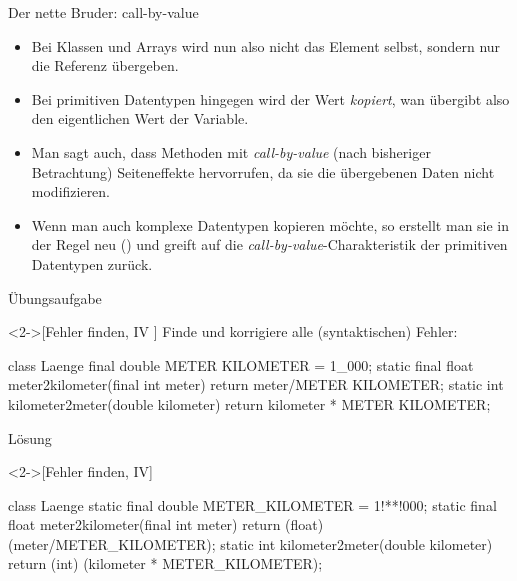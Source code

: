 \begin{frame}[fragile]{Der nette Bruder: call-by-value}
    \begin{itemize}[<+(1)->]
        \widei
        \item \hypertarget<1>{mrk:call-by-val}{Bei} Klassen und Arrays wird nun also nicht das Element selbst,\pause{} sondern nur die Referenz übergeben.
        \item Bei primitiven Datentypen hingegen wird der Wert \emph{kopiert},\pause{} wan übergibt also den eigentlichen Wert der Variable.
        \item Man sagt auch, dass Methoden mit \emph{call-by-value}  (nach bisheriger Betrachtung) Seiteneffekte hervorrufen,\pause{} da sie die übergebenen Daten nicht modifizieren.
        \item Wenn man auch komplexe Datentypen kopieren möchte,\pause{} so erstellt man sie in der Regel neu () und greift auf die \emph{call-by-value}-Charakteristik der primitiven Datentypen zurück.
    \end{itemize}
\end{frame}

\ifull
\begin{frame}[c,fragile]{Übungsaufgabe}
    \begin{exercise}<2->[Fehler finden, IV ]
        \pause{}Finde und korrigiere alle (syntaktischen) Fehler:\pause{}
        \begin{plainvoid}
class Laenge {
    final double METER KILOMETER = 1_000;
    static final float meter2kilometer(final int meter){
        return meter/METER KILOMETER;
    }
    static int kilometer2meter(double kilometer){
        return kilometer * METER KILOMETER;
    }
}
        \end{plainvoid}
    \end{exercise}
\end{frame}

\begin{frame}[c,fragile]{Lösung}
    \begin{solve}<2->[Fehler finden, IV]
        \pause{}\begin{plainjava}
class Laenge {
    static final double METER_KILOMETER = 1!**!000;
    static final float meter2kilometer(final int meter){
        return (float) (meter/METER_KILOMETER);
    }
    static int kilometer2meter(double kilometer){
        return (int) (kilometer * METER_KILOMETER);
    }
}
        \end{plainjava}
    \end{solve}
\end{frame}


